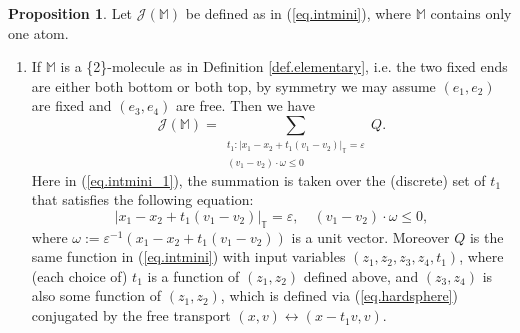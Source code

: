 \documentclass[10pt, reqno]{amsart}
\newcommand{\Mb}{\mathbb M}
\newcommand{\Tb}{\mathbb T}
\newcommand {\Jc}{\mathcal J}
\theoremstyle{definition}
\newtheorem{proposition}[theorem]{Proposition}
\theoremstyle{remark}
\numberwithin{equation}{section}
\begin{document}
\begin{proposition}\label{prop.intmini} Let $\Jc(\Mb)$ be defined as in (\ref{eq.intmini}), where $\Mb$ contains only one atom.
\begin{enumerate}
\item\label{it.intmini_1} If $\Mb$ is a \{2\}-molecule as in Definition \ref{def.elementary}, i.e. the two fixed ends are either both bottom or both top, by symmetry we may assume $(e_1,e_2)$ are fixed and $(e_3,e_4)$ are free. Then we have
\begin{equation}\label{eq.intmini_1}\Jc(\Mb)=\sum_{\substack{t_1:|x_1-x_2+t_1(v_1-v_2)|_\Tb=\varepsilon\\(v_1-v_2)\cdot\omega\leq 0}}Q.
\end{equation} Here in (\ref{eq.intmini_1}), the summation is taken over the (discrete) set of $t_1$ that satisfies the following equation:
\begin{equation}\label{eq.intmini_1+}|x_1-x_2+t_1(v_1-v_2)|_\Tb=\varepsilon,\quad (v_1-v_2)\cdot\omega\leq 0,\end{equation} where $\omega:=\varepsilon^{-1}(x_1-x_2+t_1(v_1-v_2))$ is a unit vector. Moreover $Q$ is the same function in (\ref{eq.intmini}) with input variables $(z_1,z_2,z_3,z_4,t_1)$, where (each choice of) $t_1$ is a function of $(z_1,z_2)$ defined above, and $(z_3,z_4)$ is also some function of $(z_1,z_2)$, which is defined via (\ref{eq.hardsphere}) conjugated by the free transport $(x,v)\leftrightarrow (x-t_1v,v)$.


\end{enumerate}
\end{proposition}
\end{document}

